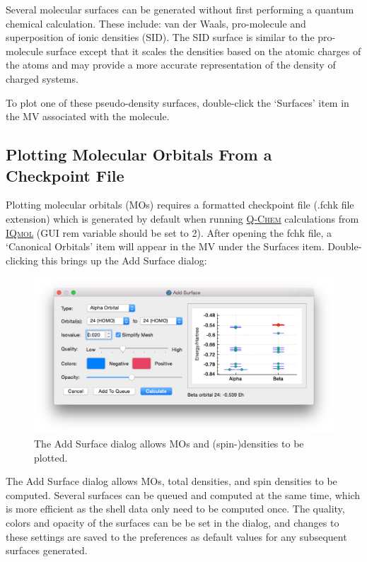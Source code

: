 \documentclass[a4paper,12pt]{article}
\newcommand{\qchem}{\href{http://q-chem.com}{{\scshape Q-Chem}}}
\newcommand{\iqmol}{\href{http://iqmol.org}{{\scshape IQmol}}}
\begin{document}
Several molecular surfaces can be generated without first performing a quantum
chemical calculation. These include: van der Waals, pro-molecule and
superposition of ionic densities (SID).  The SID surface is similar to the
pro-molecule surface except that it scales the densities based on the atomic
charges of the atoms and may provide a more accurate representation of the
density of charged systems.

To plot one of these pseudo-density surfaces, double-click the `Surfaces'
item in the MV associated with the molecule.




\subsection{Plotting Molecular Orbitals From a Checkpoint File}

\label{sec:mos}
Plotting molecular orbitals (MOs) requires a formatted checkpoint file (.fchk
file extension) which is generated by default when running \qchem{}
calculations from \iqmol{} (GUI rem variable should be set to 2).  After
opening the fchk file, a `Canonical Orbitals' item will appear in the MV under
the Surfaces item.
Double-clicking this brings up the Add Surface dialog:
\begin{figure}[h]
\begin{center}
\includegraphics[scale=0.25]{figures/MolecularOrbitalsConfigurator.png}
\caption{The Add Surface dialog allows MOs and (spin-)densities to be plotted.
} 
\label{fig:addsurface}
\end{center}
\end{figure}

The Add Surface dialog allows MOs, total densities, and spin densities  to be
computed.  Several surfaces can be queued and computed at the same time, which
is more efficient as the shell data only need to be computed once.  The
quality, colors and opacity of the surfaces can be be set in the dialog, and
changes to these settings are saved to the preferences as default values for
any subsequent surfaces generated.
\end{document}
